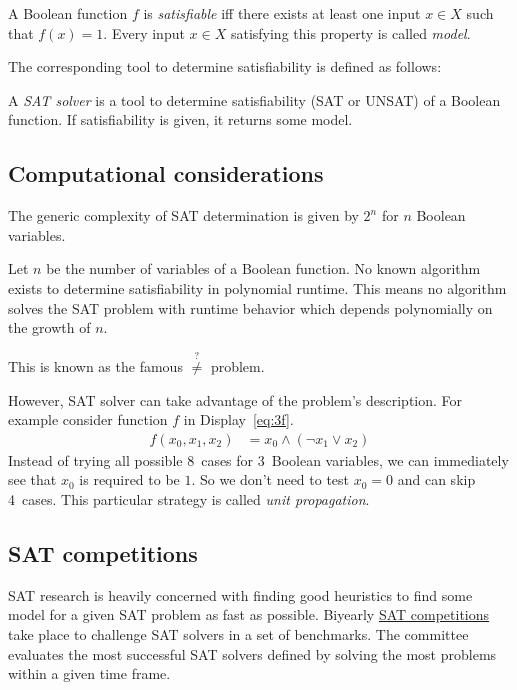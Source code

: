 \begin{defi}
  A Boolean function $f$ is \emph{satisfiable} iff there exists at least one
  input $x \in X$ such that $f(x) = 1$.
  Every input $x \in X$ satisfying this property is called \emph{model}.
\end{defi}

The corresponding tool to determine satisfiability is defined as follows:

\begin{defi}
  A \emph{SAT solver} is a tool to determine satisfiability (SAT or UNSAT)
  of a Boolean function. If satisfiability is given, it returns some model.
\end{defi}

\subsection{Computational considerations}
\label{sec:sat-complexity}
%
The generic complexity of SAT determination is given by $2^n$ for $n$ Boolean variables.

Let $n$ be the number of variables of a Boolean function.
No known algorithm exists to determine satisfiability in polynomial runtime.
This means no algorithm solves the SAT problem with runtime behavior
which depends polynomially on the growth of $n$.

This is known as the famous {\cP $\overset{?}{\neq}$ \cNP} problem.

However, SAT solver can take advantage of the problem's description.
For example consider function $f$ in Display~\ref{eq:3f}.
\begin{align} f(x_0, x_1, x_2) &= x_0 \land (\neg x_1 \lor x_2) \label{eq:3f} \end{align}
Instead of trying all possible 8~cases for 3~Boolean variables,
we can immediately see that $x_0$ is required to be $1$.
So we don't need to test $x_0 = 0$ and can skip 4~cases.
This particular strategy is called \emph{unit propagation}.

\subsection{SAT competitions}
\label{sec:sat-competitions}
%
SAT research is heavily concerned with finding good heuristics to find some model
for a given SAT problem as fast as possible. Biyearly
\href{http://satcompetition.org/}{SAT competitions} take place to challenge
SAT solvers in a set of benchmarks. The committee evaluates the most successful
SAT solvers defined by solving the most problems within a given time frame.


